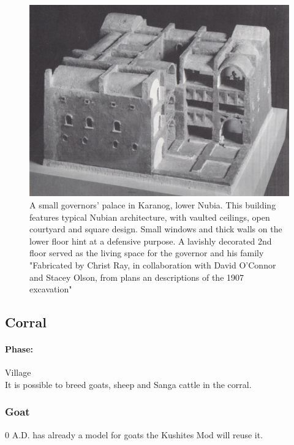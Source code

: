 \documentclass[a4paper,12pt]{scrreprt}
\begin{document}
\begin{figure}[H]
	\centering
	\includegraphics[width=\textwidth]{img/civic_center/governor_palace_karanog}
	\caption{A small governors' palace in Karanog, lower Nubia. This building features typical Nubian architecture, with vaulted ceilings, open courtyard and square design. Small windows and thick walls on the lower floor hint at a defensive purpose. A lavishly decorated 2nd floor served as the living space for the governor and his family "Fabricated by Christ Ray, in collaboration with David O'Connor and Stacey Olson, from plans an descriptions of the 1907 excavation"}\label{fig:karanog_governor_palace}
\end{figure}

\subsection{Corral}

\paragraph{Phase:} Village\\

It is possible to breed goats, sheep and Sanga cattle in the corral.


\subsubsection{Goat}

0 A.D. has already a model for goats the Kushites Mod will reuse it.
\end{document}
